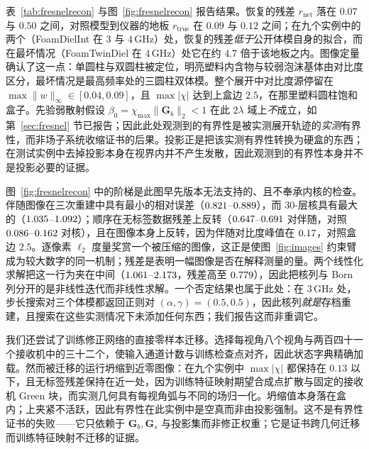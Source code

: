 \documentclass[UTF8,a4paper,11pt]{ctexart}
\newcommand{\norm}[1]{\lVert #1 \rVert}
\newcommand{\numv}[1]{#1}
\begin{document}
表~\ref{tab:fresnelrecon} 与图~\ref{fig:fresnelrecon} 报告结果。恢复的残差 $r_{\mathrm{net}}$ 落在 $0.07$ 与 $0.50$ 之间，对照模型到仪器的地板 $r_{\mathrm{true}}$ 在 $0.09$ 与 $0.12$ 之间；在九个实例中的两个（FoamDielInt 在 $3$ 与 $4\,\mathrm{GHz}$）处，恢复的残差\emph{低于}公开体模自身的拟合，而在最坏情况（FoamTwinDiel 在 $4\,\mathrm{GHz}$）处它在约 $4.7$ 倍于该地板之内。图像定量确认了这一点：单圆柱与双圆柱被定位，明亮塑料内含物与较弱泡沫基体由对比度区分，最坏情况是最高频率处的三圆柱双体模。整个展开中对比度源停留在 $\max\|w\|_\infty\in[0.04,0.09]$，且 $\max|\chi|$ 达到上盒边 $2.5$，在那里塑料圆柱饱和盒子。先验弱散射假设 $\beta_0=\chi_{\max}\norm{\mathbf{G}_b}_2<1$ 在此 $2\lambda$ 域上\emph{不}成立，如第~\ref{sec:fresnel} 节已报告；因此此处观测到的有界性是被实测展开轨迹的\emph{实测}有界性，而非场子系统收缩证书的后果。投影正是把该实测有界性转换为硬盒的东西；在测试实例中去掉投影本身在视界内并不产生发散，因此观测到的有界性本身并不是投影必要的证据。

图~\ref{fig:fresnelrecon} 中的阶梯是此图早先版本无法支持的、且不奉承内核的检查。伴随图像在三次重建中具有最小的相对误差（$\numv{\NumFrBaseDsmRreLo}$--$\numv{\NumFrBaseDsmRreHi}$），而 $30$-层核具有最大的（$\numv{\NumFrKernRreLo}$--$\numv{\NumFrKernRreHi}$）；顺序在无标签数据残差上反转（$\numv{\NumFrBaseDsmResLo}$--$\numv{\NumFrBaseDsmResHi}$ 对伴随，对照 $\numv{\NumFrKernResLo}$--$\numv{\NumFrKernResHi}$ 对核），且在图像本身上反转，因为伴随对比度峰值在 $\numv{\NumFrBaseDsmPeakHi}$，对照盒边 $2.5$。逐像素 $\ell_2$ 度量奖赏一个被压缩的图像，这正是使图~\ref{fig:images} 约束臂成为较大数字的同一机制；残差是表明一幅图像是否在解释测量的量。两个线性化求解把这一行为夹在中间（$\numv{\NumFrBaseBornRreLo}$--$\numv{\NumFrBaseBornRreHi}$，残差高至 $\numv{\NumFrBaseBornResHi}$），因此把核列与 Born 列分开的是非线性迭代而非线性求解。一个否定结果也属于此处：在 $3\,\mathrm{GHz}$ 处，步长搜索对三个体模都返回正则对 $(\alpha,\gamma)=(0.5,0.5)$，因此核列\emph{就是}存档重建，且搜索在这些实测情况下未添加任何东西；我们报告这而非重调它。

我们还尝试了训练修正网络的直接零样本迁移。选择每视角八个视角与两百四十一个接收机中的三十二个，使输入通道计数与训练检查点对齐，因此状态字典精确加载。然而被迁移的运行坍缩到近零图像：在九个实例中 $\max|\chi|$ 都保持在 $0.13$ 以下，且无标签残差保持在近一处，因为训练特征映射期望合成点扩散与固定的接收机 Green 块，而实测几何具有每视角弧与不同的场归一化。坍缩值本身落在盒内；上夹紧不活跃，因此有界性在此实例中是空真而非由投影强制。这不是有界性证书的失败——它只依赖于 $\mathbf{G}_b,\mathbf{G}_s$ 与投影集而非修正权重；它是证书跨几何迁移而训练特征映射不迁移的证据。
\end{document}

